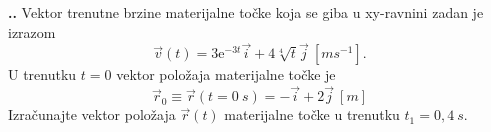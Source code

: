 
\noindent 
\textbf{
\thecjelina.\thezadatak.}
Vektor trenutne brzine materijalne točke koja se giba u xy-ravnini zadan je izrazom
$$
\vec{v}(t)=3\mathrm{e}^{-3t}\vec{i}+4\sqrt[4]{t}\vec{j}   \ [ms^{-1}]. 
$$
U trenutku $t = 0$ vektor položaja materijalne točke je
$$
\vec{r}_0\equiv \vec{r}(t=0\ s)=-\vec{i}+2\vec{j}\ [m]
$$
Izračunajte vektor položaja $\vec{r}(t)$ materijalne točke u trenutku $t_1 = 0,4\ s$.
